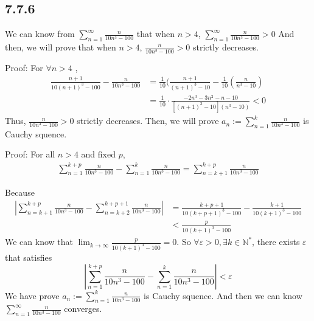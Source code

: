 \documentclass[11pt,twoside,a4paper]{article}
\begin{document}
\subsection{7.7.6}
We can know from 
$\displaystyle \sum_{n = 1}^{\infty} \frac{n}{10n^3-100} $
that when $n>4$, $\displaystyle \sum_{n = 1}^{\infty} \frac{n}{10n^3-100}>0 $
\newline
And then, we will prove that when $n>4$, $\displaystyle \frac{n}{10n^3-100}>0 $
strictly decreases.
\par
Proof:\newline
For $\forall n>4$ , 
\begin{equation}
    \begin{aligned}
        \frac{n+1}{10(n+1)^3-100}-\frac{n}{10n^3-100}
        &=\frac{1}{10}(\frac{n+1}{(n+1)^3-10}-\frac{1}{10}(\frac{n}{n^3-10}) \\
        &=\frac{1}{10}\cdot\frac{-2n^3-3n^2-n-10}{[(n+1)^3-10](n^3-10)}<0
    \end{aligned}
    \end{equation}
Thus, $\displaystyle \frac{n}{10n^3-100}>0 $ strictly decreases.\newline
Then, we will prove $a_{n}:=\sum_{n = 1}^{k}\displaystyle \frac{n}{10n^3-100}$ is Cauchy squence.
\par
Proof:\newline
For all $n>4$ and fixed $p$, 
\begin{equation}
    \begin{aligned}
        \sum_{n = 1}^{k+p} \frac{n}{10n^3-100}-\sum_{n = 1}^{k} \frac{n}{10n^3-100}
        =\sum_{n = k+1}^{k+p} \frac{n}{10n^3-100}
    \end{aligned}
    \end{equation}

Because 
\begin{equation}
    \begin{aligned}
        \left|\sum_{n = k+1}^{k+p} \frac{n}{10n^3-100}-\sum_{n = k+2}^{k+p+1} \frac{n}{10n^3-100}\right|
        &=\frac{k+p+1}{10(k+p+1)^3-100}-\frac{k+1}{10(k+1)^3-100} \\
        &<\frac{p}{10(k+1)^3-100}
    \end{aligned}
    \end{equation}
    We can know that $\displaystyle \lim_{k \to \infty} \frac{p}{10(k+1)^3-100} =0$. So 
    $\forall \varepsilon>0,\exists k \in \mathbb{N}^*$, there exists $\varepsilon$ that satisfies
    $$\left|\sum_{n = 1}^{k+p} \frac{n}{10n^3-100}-\sum_{n = 1}^{k} \frac{n}{10n^3-100}\right|<\varepsilon$$
    We have prove $a_{n}:=\sum_{n = 1}^{k} \displaystyle \frac{n}{10n^3-100}$ is Cauchy squence.
    And then we can know $\displaystyle \sum_{n = 1}^{\infty} \frac{n}{10n^3-100} $ converges.
\end{document}
